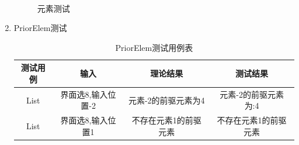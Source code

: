 \documentclass[supercite]{HustGraduPaper}
\theoremstyle{definition}
\begin{document}
\begin{enumerate}
\begin{table}[htb]
	      \end{table}
	      \begin{figure}[htb]
		      \centering
		      \quad
		      \\
		      \caption{元素测试}
	      \end{figure}
	      \newpage
	\item PriorElem测试
	      \begin{table}[htb]
		      \begin{center}
			      \setlength{\tabcolsep}{2.0mm}
			      \caption{PriorElem测试用例表}
			      \label{table7}
			      \begin{tabular}{|c|c|c|c|}
				      \hline
				      测试用例   & 输入               & 理论结果              & 测试结果              \\
				      \hline
				      \hline
				      List       & 界面选8,输入位置-2 & 元素-2的前驱元素为4   & 元素-2的前驱元素为:4  \\
				      \hline
				      List       & 界面选8,输入位置1  & 不存在元素1的前驱元素 & 不存在元素1的前驱元素 \\

\end{tabular}
\end{center}
\end{table}
\end{enumerate}
\end{document}
